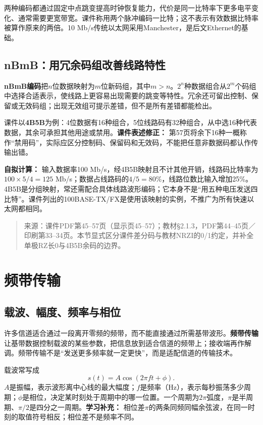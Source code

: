 两种编码都通过固定中点跳变提高时钟恢复能力，代价是同一比特率下更多电平变化、通常需要更宽带宽。课件称用两个脉冲编码一比特；这不表示有效数据比特率被算作原来的两倍。10 Mb/s传统以太网采用Manchester，是后文Ethernet的基础。
\annotationarea[4]

\subsection{nBmB：用冗余码组改善线路特性}
\textbf{nBmB编码}把$n$位数据映射为$m$位新码组，其中$m>n$。$2^n$种数据组合从$2^m$个码组中选择合适表示，使线路上更容易出现需要的跳变等特性。冗余还可留出控制、保留或无效码组；出现无效组可提示差错，但不是所有差错都能检出。

课件以\textbf{4B5B}为例：4位数据有16种组合，5位线路码有32种组合，从中选16种代表数据，其余可承担其他用途或禁用。\textbf{课件表述修正：} 第57页将余下16种一概称作“禁用码”，实际应区分控制码、保留码和无效码，不能把任意非数据码都认作传输出错。

\textbf{自拟计算：} 输入数据率100 Mb/s，经4B5B映射且不计其他开销，线路码比特率为$100\times5/4=125$ Mb/s；数据占线路码的$4/5=80\%$，线路位数比输入增加25\%。4B5B是分组映射，常还需配合具体线路波形编码；它本身不是“用五种电压发送四比特”。课件列出的100BASE-TX/FX是使用该映射的实例，不推广为所有快速以太网都相同。
\annotationarea[4]

\begin{quote}\small 来源：课件PDF第45--57页（显示页45--57）；教材§2.1.3，PDF第44--45页／印刷第33--34页。本节显式区分课件差分码与教材NRZI的0/1约定，并补全单极RZ长0与4B5B余码的边界。\end{quote}
\annotationarea[4]

\section{频带传输}\label{sec:passband}
\subsection{载波、幅度、频率与相位}
许多信道适合通过一段离开零频的频带，而不能直接通过所需基带波形。\textbf{频带传输}让基带数据控制载波的某些参数，把信息放到适合信道的频带上；接收端再作解调。频带传输不是“发送更多频率就一定更快”，而是适配信道的传输技术。

载波常写成
\[
 s(t)=A\cos(2\pi ft+\phi).
\]
$A$是振幅，表示波形离中心线的最大幅度；$f$是频率（Hz），表示每秒振荡多少周期；$\phi$是相位，决定某时刻处于周期中的哪一位置。一个周期为$2\pi$弧度，$\pi$是半周期、$\pi/2$是四分之一周期。\textbf{学习补充：} 相位差$\pi$的两条同频同幅余弦波，在同一时刻的取值符号相反；相位差不是频率不同。

